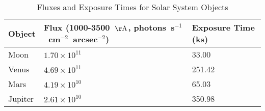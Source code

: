 \begin{table*}
\caption{Fluxes and Exposure Times for Solar System Objects\label{tab:ss_fluxes}}
\begin{center}
\begin{tabular}{lll}
\hline
\hline
Object & Flux (1000-3500~${\rm \AA}$, photons~s$^{-1}$~cm$^{-2}$~arcsec$^{-2}$) & Exposure Time (ks) \\
\hline
Moon & $1.70 \times 10^{11}$ & 33.00 \\
Venus & $4.69 \times 10^{11}$ & 251.42 \\
Mars & $4.19 \times 10^{10}$ & 65.03 \\
Jupiter & $2.61 \times 10^{10}$ & 350.98 \\
\hline
\end{tabular}
\end{center}
\end{table*}
